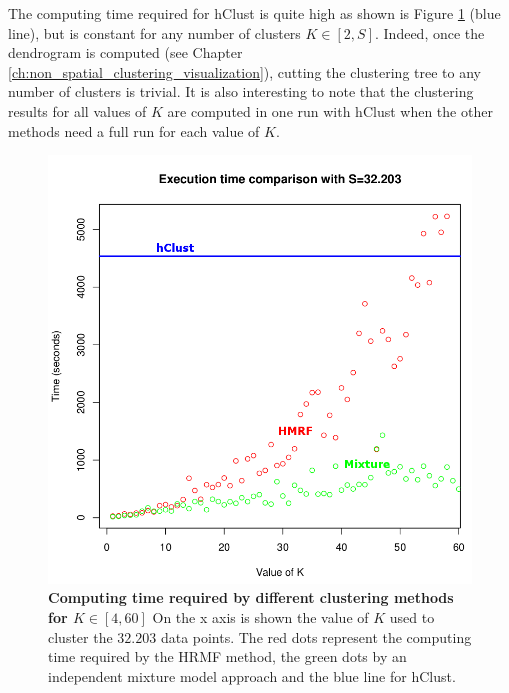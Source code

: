 	The computing time required for hClust is quite high as shown is Figure \ref{fig:computing_time} (blue line), but is constant for any number of clusters $K \in [2,S]$. Indeed, once the dendrogram is computed (see Chapter \ref{ch:non_spatial_clustering_visualization}), cutting the clustering tree to any number of clusters is trivial. It is also interesting to note that the clustering results for all values of $K$ are computed in one run with hClust when the other methods need a full run for each value of $K$.
	
	\begin{figure}[h]
\centerline{\includegraphics[width=0.6\linewidth]{gfx/chapter5/exec_time.png}}
\caption{{\bf Computing time required by different clustering methods for $K \in [4,60]$} On the x axis is shown the value of $K$ used to cluster the $32.203$ data points. The red dots represent the computing time required by the HRMF method, the green dots by an independent mixture model approach and the blue line for hClust.}
\label{fig:computing_time}
	\end{figure}





